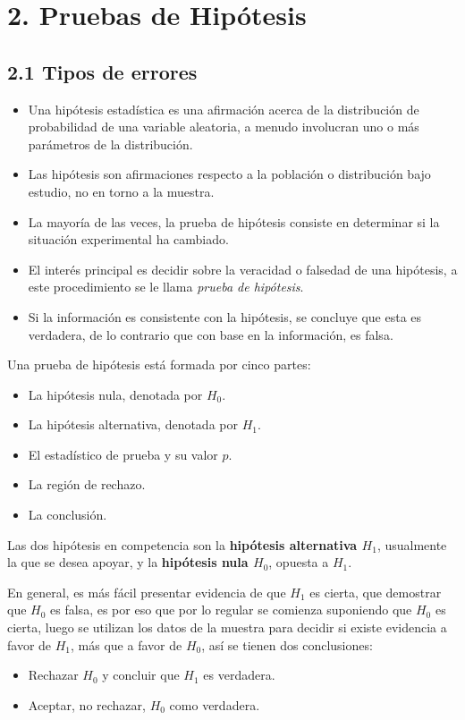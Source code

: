 
\section{2. Pruebas de Hipótesis}

\subsection{2.1 Tipos de errores}

\begin{itemize}
    \item Una hipótesis estadística es una afirmación acerca de la distribución de probabilidad de una variable aleatoria, a menudo involucran uno o más parámetros de la distribución.
    \item Las hipótesis son afirmaciones respecto a la población o distribución bajo estudio, no en torno a la muestra.
    \item La mayoría de las veces, la prueba de hipótesis consiste en determinar si la situación experimental ha cambiado.
    \item El interés principal es decidir sobre la veracidad o falsedad de una hipótesis, a este procedimiento se le llama \textit{prueba de hipótesis}.
    \item Si la información es consistente con la hipótesis, se concluye que esta es verdadera, de lo contrario que con base en la información, es falsa.
\end{itemize}

Una prueba de hipótesis está formada por cinco partes:
\begin{itemize}
    \item La hipótesis nula, denotada por $H_{0}$.
    \item La hipótesis alternativa, denotada por $H_{1}$.
    \item El estadístico de prueba y su valor $p$.
    \item La región de rechazo.
    \item La conclusión.
\end{itemize}

\begin{Def}
Las dos hipótesis en competencia son la \textbf{hipótesis alternativa $H_{1}$}, usualmente la que se desea apoyar, y la \textbf{hipótesis nula $H_{0}$}, opuesta a $H_{1}$.
\end{Def}
En general, es más fácil presentar evidencia de que $H_{1}$ es cierta, que demostrar que $H_{0}$ es falsa, es por eso que por lo regular se comienza suponiendo que $H_{0}$ es cierta, luego se utilizan los datos de la muestra para decidir si existe evidencia a favor de $H_{1}$, más que a favor de $H_{0}$, así se tienen dos conclusiones:
\begin{itemize}
    \item Rechazar $H_{0}$ y concluir que $H_{1}$ es verdadera.
    \item Aceptar, no rechazar, $H_{0}$ como verdadera.
\end{itemize}

